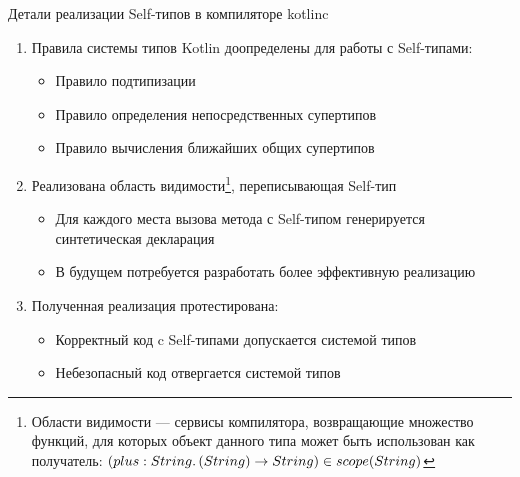 \documentclass[usenames, dvipsnames]{beamer}
\begin{document}
\begin{frame}{Детали реализации Self-типов в компиляторе kotlinc}
        \begin{enumerate}
            \item Правила системы типов Kotlin доопределены для работы с Self-типами:
            \begin{itemize}
                \item Правило подтипизации
                \item Правило определения непосредственных супертипов
                \item Правило вычисления ближайших общих супертипов
            \end{itemize}
            \item Реализована область видимости\footnote{Области видимости --- сервисы компилятора, возвращающие множество функций, для которых объект данного типа может быть использован как получатель: $(plus : String\ldotp(String) \to String) \in scope(String)$}, переписывающая Self-тип
            \begin{itemize}
                \item Для каждого места вызова метода с Self-типом генерируется синтетическая декларация %
                \item В будущем потребуется разработать более эффективную реализацию
            \end{itemize}
            \item Полученная реализация протестирована:
            \begin{itemize}
                \item Корректный код c Self-типами допускается системой типов
                \item Небезопасный код отвергается системой типов
            \end{itemize}
        \end{enumerate}
    \end{frame}
\end{document}
